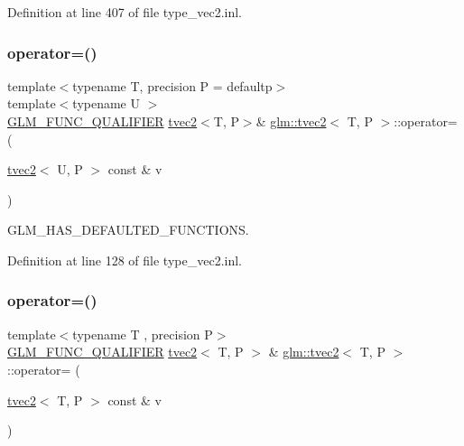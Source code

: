 Definition at line 407 of file type\+\_\+vec2.\+inl.

\mbox{\label{structglm_1_1tvec2_af214e66acab4db6f5a539ff9a161e3ba}} 
\subsubsection{\texorpdfstring{operator=()}{operator=()}\hspace{0.1cm}{\footnotesize\ttfamily [1/3]}}
{\footnotesize\ttfamily template$<$typename T, precision P = defaultp$>$ \\
template$<$typename U $>$ \\
\mbox{\hyperlink{setup_8hpp_a33fdea6f91c5f834105f7415e2a64407}{G\+L\+M\+\_\+\+F\+U\+N\+C\+\_\+\+Q\+U\+A\+L\+I\+F\+I\+ER}} \mbox{\hyperlink{structglm_1_1tvec2}{tvec2}}$<$T, P$>$\& \mbox{\hyperlink{structglm_1_1tvec2}{glm\+::tvec2}}$<$ T, P $>$\+::operator= (\begin{DoxyParamCaption}\item[{\mbox{\hyperlink{structglm_1_1tvec2}{tvec2}}$<$ U, P $>$ const \&}]{v }\end{DoxyParamCaption})}



G\+L\+M\+\_\+\+H\+A\+S\+\_\+\+D\+E\+F\+A\+U\+L\+T\+E\+D\+\_\+\+F\+U\+N\+C\+T\+I\+O\+NS. 



Definition at line 128 of file type\+\_\+vec2.\+inl.

\mbox{\label{structglm_1_1tvec2_af80d08c6419d329c7df4d622429e1d79}} 
\subsubsection{\texorpdfstring{operator=()}{operator=()}\hspace{0.1cm}{\footnotesize\ttfamily [2/3]}}
{\footnotesize\ttfamily template$<$typename T , precision P$>$ \\
\mbox{\hyperlink{setup_8hpp_a33fdea6f91c5f834105f7415e2a64407}{G\+L\+M\+\_\+\+F\+U\+N\+C\+\_\+\+Q\+U\+A\+L\+I\+F\+I\+ER}} \mbox{\hyperlink{structglm_1_1tvec2}{tvec2}}$<$ T, P $>$ \& \mbox{\hyperlink{structglm_1_1tvec2}{glm\+::tvec2}}$<$ T, P $>$\+::operator= (\begin{DoxyParamCaption}\item[{\mbox{\hyperlink{structglm_1_1tvec2}{tvec2}}$<$ T, P $>$ const \&}]{v }\end{DoxyParamCaption})}



